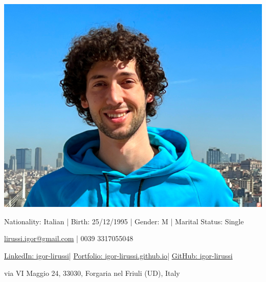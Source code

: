 \documentclass[paper=a4,fontsize=11pt, hidelinks]{temp} %
\begin{document}
\begin{minipage}{0.2\linewidth}
   \includegraphics[width=1\textwidth]{photo}
\end{minipage}      
\begin{minipage}{0.75\linewidth}
    \sepspace
    \noindent
    \hfill {\color{headings}Nationality:} Italian | {\color{headings}Birth:} 25/12/1995 | {\color{headings} Gender:} M | {\color{headings} Marital Status:} Single
    
    \hfill {\color{headings}\faEnvelope} \href{mailto:lirussi.igor@gmail.com}{lirussi.igor@gmail.com}
    | {\color{headings}\faPhone}  0039 3317055048 
    
    \hfill \href{https://www.linkedin.com/in/igor-lirussi}{{\color{headings}\faLinkedin\space LinkedIn: }igor-lirussi}| \href{https://igor-lirussi.github.io/ResearchSmall.html}{{\color{headings}\faFolder\space Portfolio: }igor-lirussi.github.io}| \href{https://github.com/igor-lirussi}{{\color{headings}\faGithub\space GitHub:} igor-lirussi}
    
    \hfill {\color{headings}\faMapMarker} via VI Maggio 24, 33030, Forgaria nel Friuli (UD), Italy
 
\end{minipage}


\noindent
\end{document}
